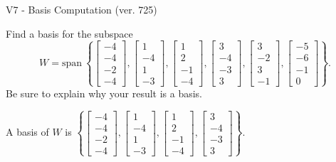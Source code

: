 \begin{exercise}
  \begin{exerciseTitle}V7 - Basis Computation (ver. 725)\end{exerciseTitle}
  \begin{exerciseStatement}
    Find a basis for the subspace 
\[W=\mathrm{span}\ \left\{\left[\begin{array}{r}
-4 \\
-4 \\
-2 \\
-4
\end{array}\right] , \left[\begin{array}{r}
1 \\
-4 \\
1 \\
-3
\end{array}\right] , \left[\begin{array}{r}
1 \\
2 \\
-1 \\
-4
\end{array}\right] , \left[\begin{array}{r}
3 \\
-4 \\
-3 \\
3
\end{array}\right] , \left[\begin{array}{r}
3 \\
-2 \\
3 \\
-1
\end{array}\right] , \left[\begin{array}{r}
-5 \\
-6 \\
-1 \\
0
\end{array}\right]\right\}.\]
 Be sure to explain why your result is a basis.


  \end{exerciseStatement}
  \begin{exerciseAnswer}
   A basis of \(W\) is  \(\left\{\left[\begin{array}{r}
-4 \\
-4 \\
-2 \\
-4
\end{array}\right] , \left[\begin{array}{r}
1 \\
-4 \\
1 \\
-3
\end{array}\right] , \left[\begin{array}{r}
1 \\
2 \\
-1 \\
-4
\end{array}\right] , \left[\begin{array}{r}
3 \\
-4 \\
-3 \\
3
\end{array}\right]\right\}\).
  


  \end{exerciseAnswer}
\end{exercise}